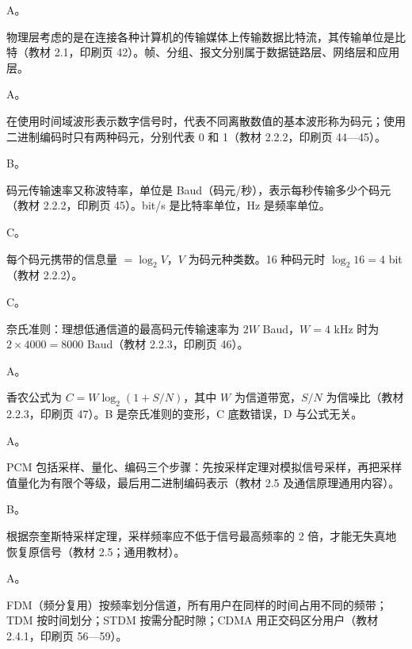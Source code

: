 \documentclass[a4paper,11pt]{article}
\begin{document}


\q A。\begin{analysis}物理层考虑的是在连接各种计算机的传输媒体上传输数据比特流，其传输单位是比特（教材 2.1，印刷页 42）。帧、分组、报文分别属于数据链路层、网络层和应用层。\end{analysis}

\q A。\begin{analysis}在使用时间域波形表示数字信号时，代表不同离散数值的基本波形称为码元；使用二进制编码时只有两种码元，分别代表 0 和 1（教材 2.2.2，印刷页 44—45）。\end{analysis}

\q B。\begin{analysis}码元传输速率又称波特率，单位是 Baud（码元/秒），表示每秒传输多少个码元（教材 2.2.2，印刷页 45）。bit/s 是比特率单位，Hz 是频率单位。\end{analysis}

\q C。\begin{analysis}每个码元携带的信息量 $=\log_2 V$，$V$ 为码元种类数。16 种码元时 $\log_2 16=4$ bit（教材 2.2.2）。\end{analysis}

\q C。\begin{analysis}奈氏准则：理想低通信道的最高码元传输速率为 $2W$ Baud，$W=4$ kHz 时为 $2\times4000=8000$ Baud（教材 2.2.3，印刷页 46）。\end{analysis}

\q A。\begin{analysis}香农公式为 $C=W\log_2(1+S/N)$，其中 $W$ 为信道带宽，$S/N$ 为信噪比（教材 2.2.3，印刷页 47）。B 是奈氏准则的变形，C 底数错误，D 与公式无关。\end{analysis}

\q A。\begin{analysis}PCM 包括采样、量化、编码三个步骤：先按采样定理对模拟信号采样，再把采样值量化为有限个等级，最后用二进制编码表示（教材 2.5 及通信原理通用内容）。\end{analysis}

\q B。\begin{analysis}根据奈奎斯特采样定理，采样频率应不低于信号最高频率的 2 倍，才能无失真地恢复原信号（教材 2.5；通用教材）。\end{analysis}

\q A。\begin{analysis}FDM（频分复用）按频率划分信道，所有用户在同样的时间占用不同的频带；TDM 按时间划分；STDM 按需分配时隙；CDMA 用正交码区分用户（教材 2.4.1，印刷页 56—59）。\end{analysis}
\end{document}
